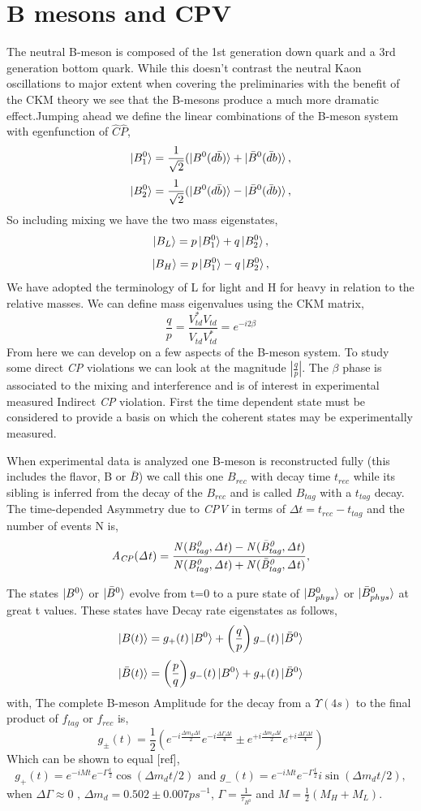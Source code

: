 \documentclass[floatfix,aps,prd,amsmath,amssymb]{revtex4}
\begin{document}
\section*{B mesons and CPV}
The neutral B-meson is composed of the 1st generation down quark and a 3rd generation bottom quark. While this doesn't contrast the neutral Kaon oscillations to major extent when covering the preliminaries with the benefit of the CKM theory we see that the B-mesons produce a much more dramatic effect.Jumping ahead we define the linear combinations of the B-meson system with egenfunction of $\hat{C}\hat{P}$,
\[\ket{B^{0}_{1}}=\frac{1}{\sqrt{2}}(\ket{B^{0}(d\bar{b})}+\ket{\bar{B}^{0}(\bar{d}b)},\]
\[\ket{B^{0}_{2}}=\frac{1}{\sqrt{2}}(\ket{B^{0}(d\bar{b})}-\ket{\bar{B}^{0}(\bar{d}b)},\]
So including mixing we have the two mass eigenstates,
\[\ket{B_{L}}=p\ket{B^{0}_{1}}+q\ket{{B}^{0}_{2}},\]
\[\ket{B_{H}}=p\ket{B^{0}_{1}}-q\ket{{B}^{0}_{2}},\]
We have adopted the terminology of L for light and H for heavy in relation to the relative masses. We can define mass eigenvalues using the CKM matrix,
\[\frac{q}{p}=\frac{V^{*}_{td}V_{td}}{V_{td}V^{*}_{td}}=e^{-i2\beta}\]
From here we can develop on a few aspects of the B-meson system. To study some direct  \textit{CP} violations we can look at the magnitude  $\left| \frac{q}{p} \right|$. The $\beta$ phase is associated to the mixing and interference and is of interest in experimental measured Indirect  \textit{CP} violation. First the time dependent state must be considered to provide a basis on which the coherent states may be experimentally measured. 


When experimental data is analyzed one B-meson is reconstructed fully (this includes the flavor, B or $\bar{B}$) we call this one $B_{rec}$ with decay time $t_{rec}$ while its sibling is inferred from the decay of the $B_{rec}$ and is called $B_{tag}$ with a $t_{tag}$ decay. The time-depended Asymmetry due to \textit{CPV} in terms of $\Delta{t} = t_{rec}-t_{tag}$ and the number of events N is,
\[\it{A}_{CP}(\Delta t)= \frac{N(B^{0}_{tag},\Delta t)-N(\bar{B}^{0}_{tag},\Delta t)}{N(B^{0}_{tag},\Delta t)+N(\bar{B}^{0}_{tag},\Delta t)},\]



The states $\ket{B^{0}}$ or $\ket{\bar{B}^{0}}$ evolve from t=0 to a pure state of $\ket{B_{phys}^{0}}$ or $\ket{\bar{B}^{0}_{phys}}$ at great t values. 
These states have Decay rate eigenstates as follows,
\[\ket{B(t)}= g_+(t)\ket{B^0}+\left(\frac{q}{p}\right)g_{-}(t)\ket{\bar{B}^0}\]
\[\ket{\bar{B}(t)}= \left(\frac{p}{q}\right)g_-(t)\ket{B^0}+g_{+}(t)\ket{\bar{B}^0}\]
with,
The complete B-meson Amplitude for the decay from a $\Upsilon(4s)$ to the final product of $f_{tag}$ or $f_{rec}$ is,
 \[g_{\pm}(t)=\frac{1}{2}(e^{-i\frac{\Delta m_d \Delta t}{2}}e^{-i\frac{\Delta\Gamma \Delta t}{4}}\pm e^{+i\frac{\Delta m_d \Delta t}{2}}e^{+i\frac{\Delta\Gamma \Delta t}{4}})\]
Which can be shown to equal [ref],
\[g_{+}(t)=e^{-iMt}e^{-\Gamma\frac{t}{2}}\cos(\Delta m_d t/2) \mbox{ and }g_{-}(t)=e^{-iMt}e^{-\Gamma\frac{t}{2}}i\sin(\Delta m_d t/2),\]
when $\Delta\Gamma \approx 0 \mbox{ , }\Delta m_d = 0.502 \pm 0.007 ps^{-1}$, $\Gamma = \frac{1}{\tau_{B^0}}$ and $M=\frac{1}{2}(M_H+M_L)$.
\end{document}
